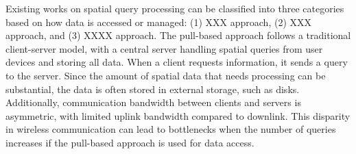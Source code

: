 Existing works on spatial query processing can be classified into three categories based on how data is accessed or managed: (1) XXX approach, (2) XXX approach, and (3) XXXX approach. The pull-based approach follows a traditional client-server model, with a central server handling spatial queries from user devices and storing all data. When a client requests information, it sends a query to the server. Since the amount of spatial data that needs processing can be substantial, the data is often stored in external storage, such as disks. Additionally, communication bandwidth between clients and servers is asymmetric, with limited uplink bandwidth compared to downlink. This disparity in wireless communication can lead to bottlenecks when the number of queries increases if the pull-based approach is used for data access.


